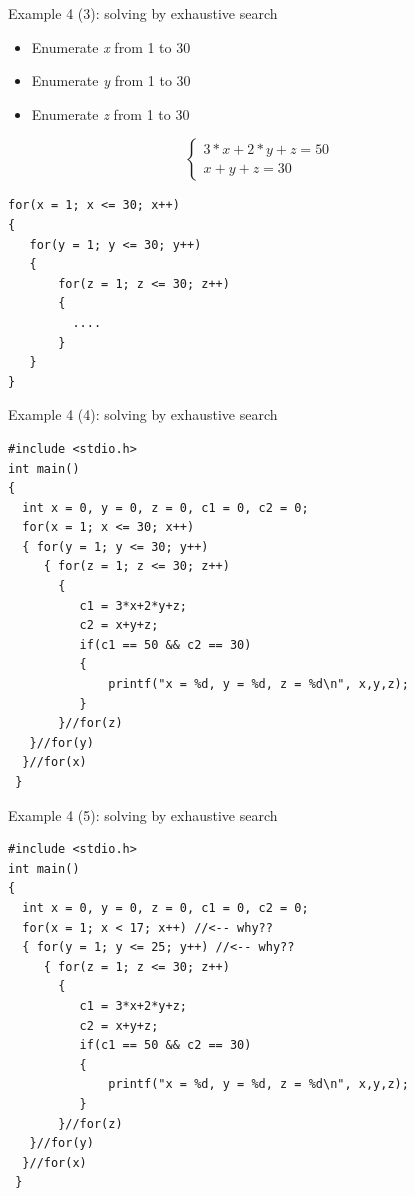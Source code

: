 \begin{frame}[fragile]{Example 4 (3): solving by exhaustive search}
\begin{itemize}
	\item {Enumerate \textit{x} from 1 to 30}
	\item {Enumerate \textit{y} from 1 to 30}
	\item {Enumerate \textit{z} from 1 to 30}
\end{itemize}
\begin{equation}
\left \{ \begin{array}{l}
  3*x+2*y+z=50 \\
  x+y+z=30
\end{array} \right.  \nonumber
\end{equation}
\begin{lstlisting}[numbers=none]
for(x = 1; x <= 30; x++)
{
   for(y = 1; y <= 30; y++)
   {
       for(z = 1; z <= 30; z++)
       {
         ....
       }
   }   
}
\end{lstlisting}
\end{frame}

\begin{frame}[fragile]{Example 4 (4): solving by exhaustive search}
\vspace{-0.15in}
\begin{lstlisting}[]
#include <stdio.h>
int main()
{
  int x = 0, y = 0, z = 0, c1 = 0, c2 = 0;
  for(x = 1; x <= 30; x++)
  { for(y = 1; y <= 30; y++)
     { for(z = 1; z <= 30; z++)
       {
          c1 = 3*x+2*y+z;
          c2 = x+y+z;
          if(c1 == 50 && c2 == 30)
          {
              printf("x = %d, y = %d, z = %d\n", x,y,z);
          }
       }//for(z)
   }//for(y)
  }//for(x)
 }
\end{lstlisting}
\end{frame}

\begin{frame}[fragile]{Example 4 (5): solving by exhaustive search}
\vspace{-0.15in}
\begin{lstlisting}[]
#include <stdio.h>
int main()
{
  int x = 0, y = 0, z = 0, c1 = 0, c2 = 0;
  for(x = 1; x < 17; x++) //<-- why??
  { for(y = 1; y <= 25; y++) //<-- why??
     { for(z = 1; z <= 30; z++)
       {
          c1 = 3*x+2*y+z;
          c2 = x+y+z;
          if(c1 == 50 && c2 == 30)
          {
              printf("x = %d, y = %d, z = %d\n", x,y,z);
          }
       }//for(z)
   }//for(y)
  }//for(x)
 }
\end{lstlisting}
\end{frame}


